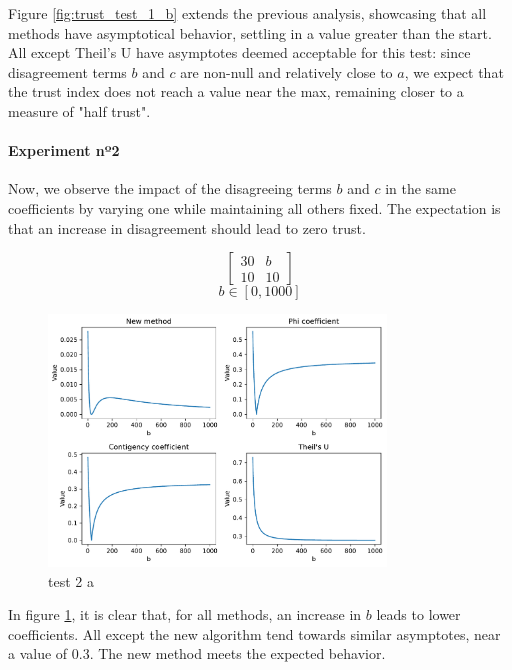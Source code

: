 Figure \ref{fig:trust_test_1_b} extends the previous analysis, showcasing that all methods have asymptotical behavior, settling in a value greater than the start. All except Theil's U have asymptotes deemed acceptable for this test: since disagreement terms $b$ and $c$ are non-null and relatively close to $a$, we expect that the trust index does not reach a value near the max, remaining closer to a measure of "half trust".

\paragraph{Experiment nº2} Now, we observe the impact of the disagreeing terms $b$ and $c$ in the same coefficients by varying one while maintaining all others fixed. The expectation is that an increase in disagreement should lead to zero trust.

$$
\begin{bmatrix}
    30 & b \\ 10 & 10
\end{bmatrix}
$$
$$
b \in [0, 1000]
$$
\begin{figure}[h!]
\centering
    \includegraphics[width=0.8\textwidth]{figures/chapter4/cell/trust_tests/2_a.pdf}
    \caption{test 2 a}
    \label{fig:trust_test_2_a}
\end{figure}
\FloatBarrier

In figure \ref{fig:trust_test_2_a}, it is clear that, for all methods, an increase in $b$ leads to lower coefficients. All except the new algorithm tend towards similar asymptotes, near a value of 0.3. The new method meets the expected behavior.

